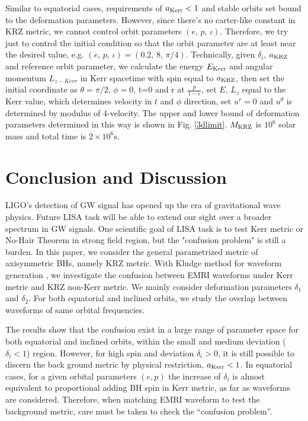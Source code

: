\documentclass{article}
\begin{document}
Similar to equatorial cases, requirements of $a_{\rm{Kerr}}<1$ and stable orbits set bound to the deformation parameters. However, since there's no carter-like constant in KRZ metric, we cannot control orbit parameters $(e,\, p,\, \iota)$. Therefore, we try just to control the initial condition so that the orbit parameter are at least near the desired value, e.g. $(e,\, p,\, \iota) = (0.2,\, 8,\, \pi/4 )$. Technically, given $\delta_i$, $a_{\rm{KRZ}}$ and reference orbit parameter, we calculate the energy $E_{\rm{Kerr}}$ and angular momentum $L_{z -Kerr}$ in Kerr spacetime with spin equal to $a_{\rm{KRZ}}$, then set the initial coordinate as $\theta=\pi/2$, $\phi=0$, t=0 and r at $\frac{p}{1-e}$, set $E,\, L_z$ equal to the Kerr value, which determines velocity in $t$ and $\phi$ direction, set $u^r=0$ and $u^\theta$ is determined by modulus of 4-velocity. The upper and lower bound of deformation parameters determined in this way is shown in Fig. \ref{3dlimit}. $M_{\rm{KRZ}}$ is $10^6$ solar mass and total time is $2\times 10^6$s.


\section{Conclusion and Discussion}
\label{p_fin}

LIGO's detection of GW signal has opened up the era of gravitational wave physics. Future LISA task will be able to extend our sight over a broader spectrum in GW signals. One scientific goal of LISA task is to test Kerr metric or No-Hair Theorem in strong field region, but the "confusion problem" is still a burden. In this paper, we consider the general parametrized metric of axisymmetric BHs, namely KRZ metric. With Kludge method for waveform generation , we investigate the confusion between EMRI waveforms under Kerr metric and KRZ non-Kerr metric. We mainly consider deformation parameters $\delta_1$ and $\delta_2$. For both equatorial and inclined orbits, we study the overlap between waveforms of same orbital frequencies.

The results show that the confusion exist in a large range of parameter space for both equatorial and inclined orbits, within the small and medium deviation ($\delta_i<1$) region. However, for high spin and deviation $\delta_i>0$, it is still possible to discern the back ground metric by physical restriction, $a_{\rm{Kerr}}<1$. In equatorial cases, for a given orbital parameters $(e,p)$ the increase of $\delta_i$ is almost equivalent to proportional adding BH spin in Kerr metric, as far as waveforms are considered. Therefore, when matching EMRI waveform to test the background metric, care must be taken to check the ``confusion problem''. 
\end{document}
